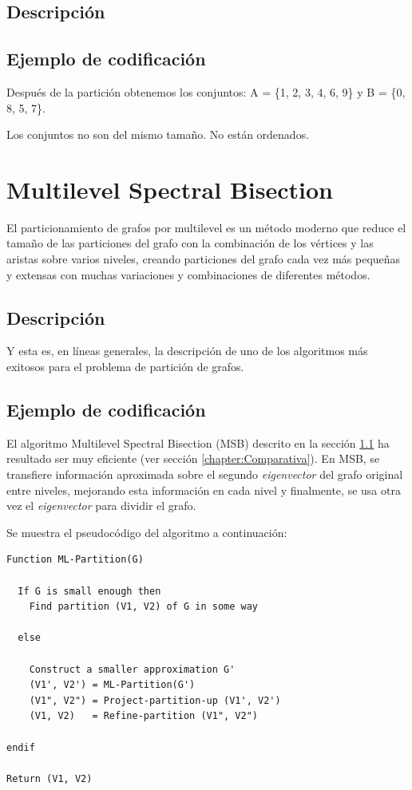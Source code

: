\subsection{Descripción}

\subsection{Ejemplo de codificación}

Después de la partición obtenemos los conjuntos: A = \{1, 2, 3, 4, 6, 9\} y B = \{0, 8, 5, 7\}.

Los conjuntos no son del mismo tamaño. No están ordenados.

\newpage
\section{Multilevel Spectral Bisection}\label{Multilevel-Spectral-Bisection}

El particionamiento de grafos por multilevel es un método moderno que reduce el tamaño de las particiones del grafo con la combinación de los vértices y las aristas sobre varios niveles, creando particiones del grafo cada vez más pequeñas y extensas con muchas variaciones y combinaciones de diferentes métodos.

\subsection{Descripción}\label{msb_description}

Y esta es, en líneas generales, la descripción de uno de los algoritmos más exitosos para el problema de partición de grafos.

\subsection{Ejemplo de codificación}

El algoritmo Multilevel Spectral Bisection (MSB) descrito en la sección \ref{msb_description} ha resultado ser muy eficiente (ver sección \ref{chapter:Comparativa}). En MSB, se transfiere información aproximada sobre el segundo \textit{eigenvector} del grafo original entre niveles, mejorando esta información en cada nivel y finalmente, se usa otra vez el \textit{eigenvector} para dividir el grafo. 

Se muestra el pseudocódigo del algoritmo a continuación:

\begin{lstlisting}[frame=single] 
Function ML-Partition(G)

  If G is small enough then
    Find partition (V1, V2) of G in some way
    
  else

    Construct a smaller approximation G'
    (V1', V2') = ML-Partition(G')
    (V1", V2") = Project-partition-up (V1', V2')
    (V1, V2)   = Refine-partition (V1", V2")

endif

Return (V1, V2)
\end{lstlisting}

